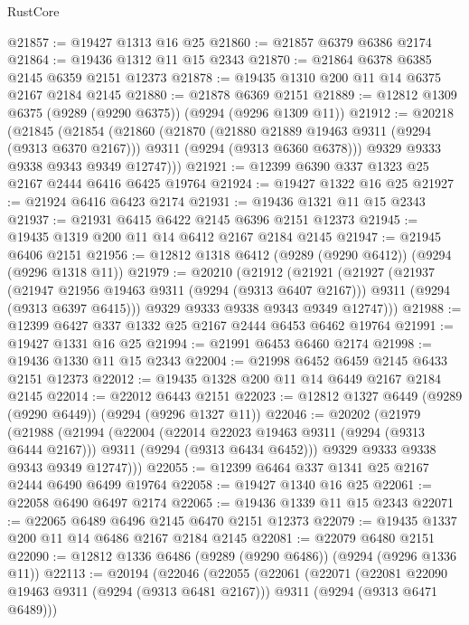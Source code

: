 \begin{lexlean}{RustCore}
\begin{coremodule}
@21857 := @19427 @1313 @16 @25
@21860 := @21857 @6379 @6386 @2174
@21864 := @19436 @1312 @11 @15 @2343
@21870 := @21864 @6378 @6385 @2145 @6359 @2151 @12373
@21878 := @19435 @1310 @200 @11 @14 @6375 @2167 @2184 @2145
@21880 := @21878 @6369 @2151
@21889 := @12812 @1309 @6375 (@9289 (@9290 @6375)) (@9294 (@9296 @1309 @11))
@21912 := @20218
    (@21845
      (@21854
        (@21860
          (@21870
            (@21880 @21889 @19463 @9311 (@9294 (@9313 @6370 @2167)))
            @9311
            (@9294 (@9313 @6360 @6378)))
          @9329
          @9333
          @9338
          @9343
          @9349
          @12747)))
@21921 := @12399 @6390 @337 @1323 @25 @2167 @2444 @6416 @6425 @19764
@21924 := @19427 @1322 @16 @25
@21927 := @21924 @6416 @6423 @2174
@21931 := @19436 @1321 @11 @15 @2343
@21937 := @21931 @6415 @6422 @2145 @6396 @2151 @12373
@21945 := @19435 @1319 @200 @11 @14 @6412 @2167 @2184 @2145
@21947 := @21945 @6406 @2151
@21956 := @12812 @1318 @6412 (@9289 (@9290 @6412)) (@9294 (@9296 @1318 @11))
@21979 := @20210
    (@21912
      (@21921
        (@21927
          (@21937
            (@21947 @21956 @19463 @9311 (@9294 (@9313 @6407 @2167)))
            @9311
            (@9294 (@9313 @6397 @6415)))
          @9329
          @9333
          @9338
          @9343
          @9349
          @12747)))
@21988 := @12399 @6427 @337 @1332 @25 @2167 @2444 @6453 @6462 @19764
@21991 := @19427 @1331 @16 @25
@21994 := @21991 @6453 @6460 @2174
@21998 := @19436 @1330 @11 @15 @2343
@22004 := @21998 @6452 @6459 @2145 @6433 @2151 @12373
@22012 := @19435 @1328 @200 @11 @14 @6449 @2167 @2184 @2145
@22014 := @22012 @6443 @2151
@22023 := @12812 @1327 @6449 (@9289 (@9290 @6449)) (@9294 (@9296 @1327 @11))
@22046 := @20202
    (@21979
      (@21988
        (@21994
          (@22004
            (@22014 @22023 @19463 @9311 (@9294 (@9313 @6444 @2167)))
            @9311
            (@9294 (@9313 @6434 @6452)))
          @9329
          @9333
          @9338
          @9343
          @9349
          @12747)))
@22055 := @12399 @6464 @337 @1341 @25 @2167 @2444 @6490 @6499 @19764
@22058 := @19427 @1340 @16 @25
@22061 := @22058 @6490 @6497 @2174
@22065 := @19436 @1339 @11 @15 @2343
@22071 := @22065 @6489 @6496 @2145 @6470 @2151 @12373
@22079 := @19435 @1337 @200 @11 @14 @6486 @2167 @2184 @2145
@22081 := @22079 @6480 @2151
@22090 := @12812 @1336 @6486 (@9289 (@9290 @6486)) (@9294 (@9296 @1336 @11))
@22113 := @20194
    (@22046
      (@22055
        (@22061
          (@22071
            (@22081 @22090 @19463 @9311 (@9294 (@9313 @6481 @2167)))
            @9311
            (@9294 (@9313 @6471 @6489)))

\end{coremodule}
\end{lexlean}
